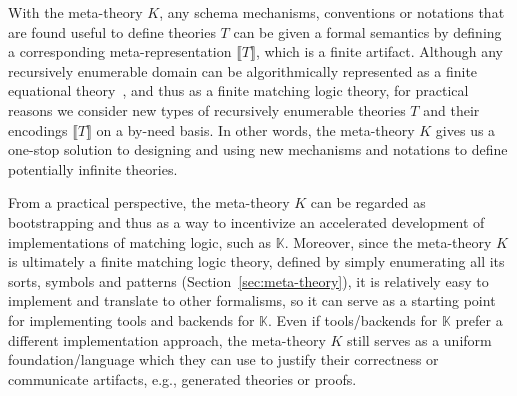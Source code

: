 \documentclass[UTF8,11pt]{article}
\theoremstyle{plain}
\theoremstyle{definition}
\theoremstyle{remark}
\newcommand{\K}{\mbox{$\mathbb{K}$}\xspace}
\newcommand{\denote}[1]{\llbracket{#1}\rrbracket}
\begin{document}
With the meta-theory $K$, any schema mechanisms, conventions or notations
that are found useful to define theories $T$ can be given a formal semantics by
defining a corresponding meta-representation $\denote{T}$, which is a finite
artifact.
Although any recursively enumerable domain can be algorithmically represented
as a finite equational theory~\cite{bt95}, and thus as a finite matching logic
theory, for practical reasons we consider new types of recursively
enumerable theories $T$ and their encodings $\denote{T}$ on a by-need basis.
In other words, the meta-theory $K$ gives us a one-stop solution to designing
and using new mechanisms and notations to define potentially infinite
theories.

From a practical perspective, the meta-theory $K$ can be regarded as
bootstrapping and thus as a way to incentivize an accelerated development of
implementations of matching logic, such as \K.
Moreover, since the meta-theory $K$ is ultimately a finite matching logic
theory, defined by simply enumerating all its sorts, symbols and patterns
(Section~\ref{sec:meta-theory}), it is relatively easy to implement and
translate to other formalisms, so it can serve as a starting point for
implementing tools and backends for \K.
Even if tools/backends for \K prefer a different implementation
approach, the meta-theory $K$ still serves as a uniform foundation/language
which they can use to justify their correctness or communicate artifacts,
e.g., generated theories or proofs.

%
%
\end{document}

